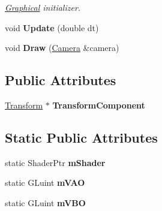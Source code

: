 \begin{DoxyCompactItemize}
\begin{DoxyCompactList}\small\item\em \hyperlink{classDCEngine_1_1Components_1_1Graphical}{Graphical} initializer. \end{DoxyCompactList}\item 
\hypertarget{classDCEngine_1_1Components_1_1SpriteText_a1da66748973097cb1dcfb45e8afe4e2e}{void {\bfseries Update} (double dt)}\label{classDCEngine_1_1Components_1_1SpriteText_a1da66748973097cb1dcfb45e8afe4e2e}

\item 
\hypertarget{classDCEngine_1_1Components_1_1SpriteText_a8b13650883256333304784e718cec0c8}{void {\bfseries Draw} (\hyperlink{classDCEngine_1_1Components_1_1Camera}{Camera} \&camera)}\label{classDCEngine_1_1Components_1_1SpriteText_a8b13650883256333304784e718cec0c8}

\end{DoxyCompactItemize}
\subsection*{Public Attributes}
\begin{DoxyCompactItemize}
\item 
\hypertarget{classDCEngine_1_1Components_1_1SpriteText_a5b9d23c96be9109713d9b692257227f3}{\hyperlink{classDCEngine_1_1Components_1_1Transform}{Transform} $\ast$ {\bfseries Transform\-Component}}\label{classDCEngine_1_1Components_1_1SpriteText_a5b9d23c96be9109713d9b692257227f3}

\end{DoxyCompactItemize}
\subsection*{Static Public Attributes}
\begin{DoxyCompactItemize}
\item 
\hypertarget{classDCEngine_1_1Components_1_1SpriteText_acd394a395bc6df20afc4ac673717a31a}{static Shader\-Ptr {\bfseries m\-Shader}}\label{classDCEngine_1_1Components_1_1SpriteText_acd394a395bc6df20afc4ac673717a31a}

\item 
\hypertarget{classDCEngine_1_1Components_1_1SpriteText_abefeca48bfb75fc6f7fd440ce8174238}{static G\-Luint {\bfseries m\-V\-A\-O}}\label{classDCEngine_1_1Components_1_1SpriteText_abefeca48bfb75fc6f7fd440ce8174238}

\item 
\hypertarget{classDCEngine_1_1Components_1_1SpriteText_aa3ffc9107e519f912b6fc6e9fd06d5fb}{static G\-Luint {\bfseries m\-V\-B\-O}}\label{classDCEngine_1_1Components_1_1SpriteText_aa3ffc9107e519f912b6fc6e9fd06d5fb}

\end{DoxyCompactItemize}
